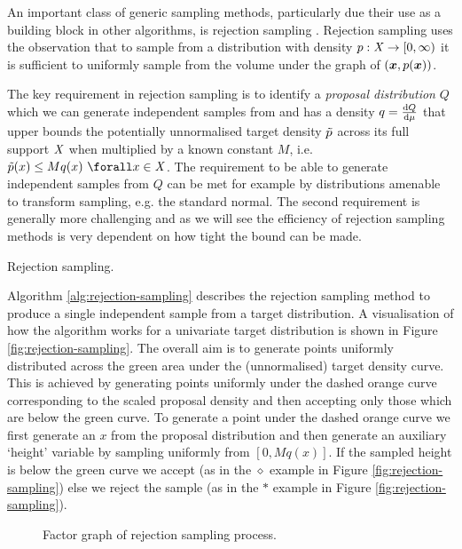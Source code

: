 An important class of generic sampling methods, particularly due their use as a building block in other algorithms, is rejection sampling \citep{vonneumann1951various}. Rejection sampling uses the observation that to sample from a distribution with density $p : \mathit{X} \to [0, \infty)$ it is sufficient to uniformly sample from the volume under the graph of $\lpa\vct{x}, \tgtdens(\vct{x})\rpa$.

The key requirement in rejection sampling is to identify a \emph{proposal distribution} $Q$ which we can generate independent samples from and has a density $q=\frac{\mathrm{d} Q}{\mathrm{d} \mu}$ that upper bounds the potentially unnormalised target density $\tilde{p}$ across its full support $\mathit{X}$ when multiplied by a known constant $M$, i.e. $\utgtdens(x) \leq M q(x) ~\forall x \in \set{X}$. The requirement to be able to generate independent samples from $Q$ can be met for example by distributions amenable to transform sampling, e.g. the standard normal. The second requirement is generally more challenging and as we will see the efficiency of rejection sampling methods is very dependent on how tight the bound can be made.

\begin{algorithm}[!t]
\caption{Rejection sampling.}
\label{alg:rejection-sampling}

\end{algorithm}

Algorithm \ref{alg:rejection-sampling} describes the rejection sampling method to produce a single independent sample from a target distribution. A visualisation of how the algorithm works for a univariate target distribution is shown in Figure \ref{fig:rejection-sampling}. The overall aim is to generate points uniformly distributed across the green area under the (unnormalised) target density curve. This is achieved by generating points uniformly under the dashed orange curve corresponding to the scaled proposal density and then accepting only those which are below the green curve. To generate a point under the dashed orange curve we first generate an $x$ from the proposal distribution and then generate an auxiliary `height' variable by sampling uniformly from $[0, Mq(x)]$. If the sampled height is below the green curve we accept (as in the $\diamond$ example in Figure \ref{fig:rejection-sampling}) else we reject the sample (as in the $*$ example in Figure \ref{fig:rejection-sampling}).

\begin{figure}[t]
\centering
{}
\caption{Factor graph of rejection sampling process.}
\label{fig:rejection-sampling-factor-graph}
\end{figure}

